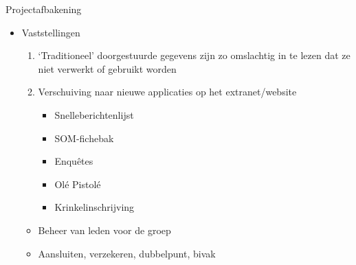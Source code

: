 \documentclass[chiro,pdf]{prosper}
\begin{document}
%
%

{
\begin{slide}{Projectafbakening}

\begin{itemize}
\item Vaststellingen
\begin{itemize}
{
\begin{enumerate}
\item `Traditioneel' doorgestuurde gegevens zijn zo omslachtig in te lezen dat ze niet verwerkt of gebruikt worden
\item Verschuiving naar nieuwe applicaties op het extranet/website
\begin{itemize}
\item Snelleberichtenlijst
\item SOM-fichebak
\item Enqu\^etes
\item Ol\'e Pistol\'e
\item Krinkelinschrijving
\end{itemize}
\end{enumerate}
}
\end{itemize}
{
\begin{itemize}
\item Beheer van leden voor de groep
\item Aansluiten, verzekeren, dubbelpunt, bivak
\end{itemize}
}
\end{itemize}

\end{slide}
}

%
%
\end{document}
